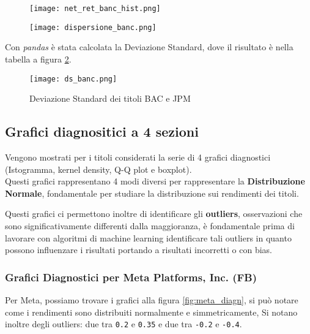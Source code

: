\begin{figure}[h]
  \centering
  \begin{minipage}{.5\textwidth}
    \centering
    \texttt{[image: net\_ret\_banc\_hist.png]}
    \label{fig:isto_rendimenti_banc}
  \end{minipage}%
  \begin{minipage}{.5\textwidth}
    \centering
    \texttt{[image: dispersione\_banc.png]}
    \label{fig:dispersione_banc}
  \end{minipage}
\end{figure}

Con \emph{pandas} è stata calcolata la Deviazione Standard, dove il risultato è nella tabella a figura \ref{fig:ds_banc}.

\begin{figure}[h]
  \centering
  \texttt{[image: ds\_banc.png]}
  \caption{Deviazione Standard dei titoli BAC e JPM}
  \label{fig:ds_banc}
\end{figure}

\pagebreak

\subsection{Grafici diagnositici a 4 sezioni}

Vengono mostrati per i titoli considerati la serie di 4 grafici diagnostici (Istogramma, kernel density, Q-Q plot e boxplot).\\
Questi grafici rappresentano 4 modi diversi per rappresentare la \textbf{Distribuzione Normale}, fondamentale per studiare la distribuzione sui rendimenti dei titoli.

Questi grafici ci permettono inoltre di identificare gli \textbf{outliers}, osservazioni che sono significativamente differenti dalla maggioranza, è fondamentale prima di lavorare con algoritmi di machine learning identificare tali outliers in quanto possono influenzare i risultati
portando a risultati incorretti o con bias.

\subsubsection{Grafici Diagnostici per Meta Platforms, Inc. (FB)}

Per Meta, possiamo trovare i grafici alla figura \ref{fig:meta_diagn}, si può notare come i rendimenti sono distribuiti normalmente e simmetricamente,
Si notano inoltre degli outliers: due tra \verb|0.2| e \verb|0.35| e due tra \verb|-0.2| e \verb|-0.4|.

